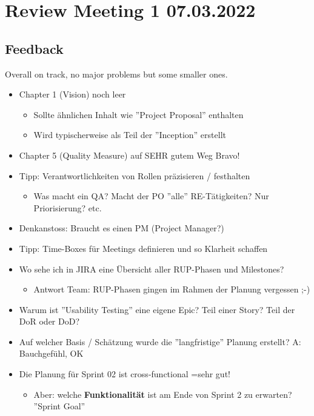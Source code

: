 \section{Review Meeting 1 07.03.2022}

\subsection{Feedback}
Overall on track, no major problems but some smaller ones.

\begin{itemize}
    \item Chapter 1 (Vision) noch leer
    \begin{itemize}
        \item Sollte ähnlichen Inhalt wie ''Project Proposal'' enthalten
        \item Wird typischerweise als Teil der ''Inception'' erstellt
    \end{itemize}
    \item Chapter 5 (Quality Measure) auf SEHR gutem Weg \textrightarrow Bravo!
    \item Tipp: Verantwortlichkeiten von Rollen präzisieren / festhalten
    \begin{itemize}
        \item Was macht ein QA? Macht der PO ''alle'' RE-Tätigkeiten? Nur Priorisierung? etc.
    \end{itemize}
    \item Denkanstoss: Braucht es einen PM (Project Manager?)
    \item Tipp: Time-Boxes für Meetings definieren und so Klarheit schaffen
    \item Wo sehe ich in JIRA eine Übersicht aller RUP-Phasen und Milestones?
    \begin{itemize}
        \item Antwort Team: RUP-Phasen gingen im Rahmen der Planung vergessen ;-)
    \end{itemize}
    \item Warum ist ''Usability Testing'' eine eigene Epic? Teil einer Story? Teil der DoR oder DoD?
    \item Auf welcher Basis / Schätzung wurde die ''langfristige'' Planung erstellt? \textrightarrow A: Bauchgefühl, OK
    \item Die Planung für Sprint 02 ist cross-functional =\textrightarrow sehr gut!
    \begin{itemize}
        \item Aber: welche \textbf{Funktionalität} ist am Ende von Sprint 2 zu erwarten? \textrightarrow ''Sprint Goal''

\end{itemize}
\end{itemize}
